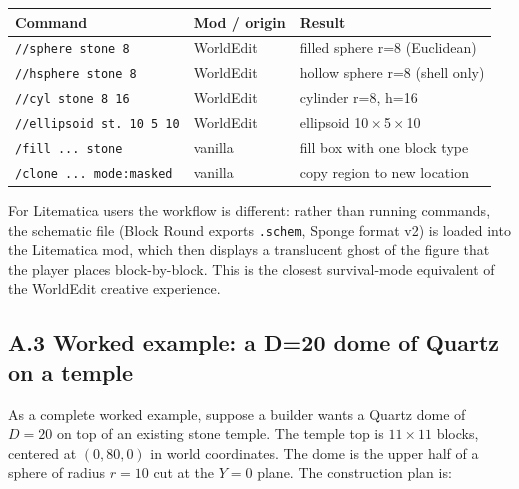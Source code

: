 \documentclass[12pt,a4paper]{scrartcl}
\newcommand{\code}[1]{\texttt{\small #1}}
\newcommand{\cmd}[1]{\textcolor{earth}{\texttt{\small #1}}}
\begin{document}
\vspace{0.4em}
\begin{center}
\small
\begin{tabularx}{\textwidth}{@{}llX@{}}
\toprule
\textbf{Command} & \textbf{Mod / origin} & \textbf{Result} \\
\midrule
\cmd{//sphere stone 8}     & WorldEdit & filled sphere r=8 (Euclidean)  \\
\cmd{//hsphere stone 8}    & WorldEdit & hollow sphere r=8 (shell only)  \\
\cmd{//cyl stone 8 16}     & WorldEdit & cylinder r=8, h=16  \\
\cmd{//ellipsoid st. 10 5 10} & WorldEdit & ellipsoid 10\,$\times$\,5\,$\times$\,10  \\
\cmd{/fill ... stone}      & vanilla & fill box with one block type  \\
\cmd{/clone ... mode:masked} & vanilla & copy region to new location  \\
\bottomrule
\end{tabularx}
\end{center}

For Litematica users the workflow is different: rather than running commands, the schematic file (Block Round exports \code{.schem}, Sponge format v2) is loaded into the Litematica mod, which then displays a translucent ghost of the figure that the player places block-by-block. This is the closest survival-mode equivalent of the WorldEdit creative experience.

\subsection*{A.3 Worked example: a D=20 dome of Quartz on a temple}
As a complete worked example, suppose a builder wants a Quartz dome of $D=20$ on top of an existing stone temple. The temple top is $11 \times 11$ blocks, centered at $(0,80,0)$ in world coordinates. The dome is the upper half of a sphere of radius $r=10$ cut at the $Y=0$ plane. The construction plan is:
\end{document}

